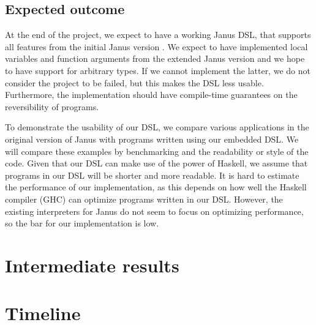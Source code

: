 \documentclass[12pt,a4paper]{article}
\begin{document}
\subsection{Expected outcome}
At the end of the project, we expect to have a working Janus DSL, that supports all features from the initial Janus version \cite{lutz82}. We expect to have implemented local variables and function arguments from the extended Janus version \cite{yokoyama10} and we hope to have support for arbitrary types. If we cannot implement the latter, we do not consider the project to be failed, but this makes the DSL less usable. Furthermore, the implementation should have compile-time guarantees on the reversibility of programs.

To demonstrate the usability of our DSL, we compare various applications in the original version of Janus with programs written using our embedded DSL. We will compare these examples by benchmarking and the readability or style of the code. Given that our DSL can make use of the power of Haskell, we assume that programs in our DSL will be shorter and more readable. It is hard to estimate the performance of our implementation, as this depends on how well the Haskell compiler (GHC) can optimize programs written in our DSL. However, the existing interpreters for Janus do not seem to focus on optimizing performance, so the bar for our implementation is low.

\section{Intermediate results}

\section{Timeline}
\end{document}

